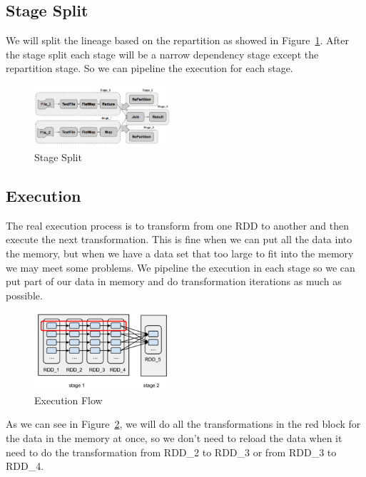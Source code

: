 \subsection{Stage Split} %
\label{sub:stage_split}
We will split the lineage based on the repartition as showed in Figure~\ref{fig:stage_split}. After the stage split each stage will be a narrow dependency stage except the repartition stage. So we can pipeline the execution for each stage.
\begin{figure}[ht]
    \centering
    \includegraphics[width=0.45\textwidth]{images/stage_split.png}
    \caption{Stage Split}\label{fig:stage_split}
\end{figure}

\subsection{Execution} %
\label{sub:execution}
The real execution process is to transform from one RDD to another and then execute the next transformation. This is fine when we can put all the data into the memory, but when we have a data set that too large to fit into the memory we may meet some problems. We pipeline the execution in each stage so we can put part of our data in memory and do transformation iterations as much as possible.

\begin{figure}[ht]
    \centering
    \includegraphics[width=0.45\textwidth]{images/execution_flow.png}
    \caption{Execution Flow}\label{fig:execution_flow}
\end{figure}

As we can see in Figure~\ref{fig:execution_flow}, we will do all the transformations in the red block for the data in the memory at once, so we don’t need to reload the data when it need to do the transformation from RDD\_2 to RDD\_3 or from RDD\_3 to RDD\_4.

